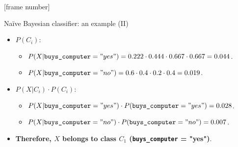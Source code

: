 \documentclass[aspectratio=169,t,table]{beamer}
\begin{document}
  {
    [frame number]
    \begin{frame}{Naïve Bayesian classifier: an example (II)}
      \begin{itemize}
        \item $P(C_i)$:
        \begin{itemize}
          \item $P(X | \texttt{buys\_computer} = "yes") = 0.222 \cdot 0.444 \cdot 0.667 \cdot 0.667 = 0.044$.
          \item $P(X | \texttt{buys\_computer} = "no") = 0.6 \cdot 0.4 \cdot 0.2 \cdot 0.4 = 0.019$.
        \end{itemize}
        \item $P(X | C_i) \cdot P(C_i)$:
        \begin{itemize}
          \item $P(X | \texttt{buys\_computer} = "yes") \cdot  P(\texttt{buys\_computer} = "yes") = 0.028$.
          \item $P(X | \texttt{buys\_computer} = "no") \cdot  P(\texttt{buys\_computer} = "no") = 0.007$.
        \end{itemize}
        \item \textbf{Therefore, $X$ belongs to class $C_1$ (\texttt{buys\_computer} = "yes")}.
      \end{itemize}
    \end{frame}
  }
\end{document}
